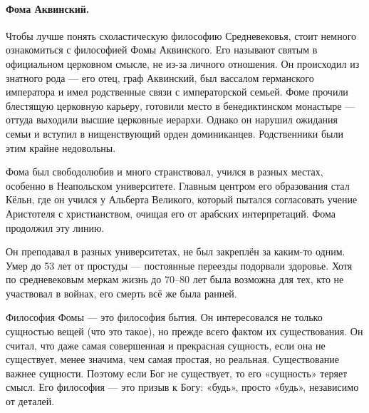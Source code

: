 
\paragraph{Фома Аквинский.} Чтобы лучше понять схоластическую философию Средневековья, стоит немного ознакомиться с философией Фомы Аквинского. Его называют святым в официальном церковном смысле, не из-за личного отношения. Он происходил из знатного рода --- его отец, граф Аквинский, был вассалом германского императора и имел родственные связи с императорской семьей. Фоме прочили блестящую церковную карьеру, готовили место в бенедиктинском монастыре --- оттуда выходили высшие церковные иерархи. Однако он нарушил ожидания семьи и вступил в нищенствующий орден доминиканцев. Родственники были этим крайне недовольны.

Фома был свободолюбив и много странствовал, учился в разных местах, особенно в Неапольском университете. Главным центром его образования стал Кёльн, где он учился у Альберта Великого, который пытался согласовать учение Аристотеля с христианством, очищая его от арабских интерпретаций. Фома продолжил эту линию.

Он преподавал в разных университетах, не был закреплён за каким-то одним. Умер до 53 лет от простуды --- постоянные переезды подорвали здоровье. Хотя по средневековым меркам жизнь до 70–80 лет была возможна для тех, кто не участвовал в войнах, его смерть всё же была ранней.

Философия Фомы --- это философия бытия. Он интересовался не только сущностью вещей (что это такое), но прежде всего фактом их существования. Он считал, что даже самая совершенная и прекрасная сущность, если она не существует, менее значима, чем самая простая, но реальная. Существование важнее сущности. Поэтому если Бог не существует, то его «сущность» теряет смысл. Его философия --- это призыв к Богу: «будь», просто «будь», независимо от деталей.

